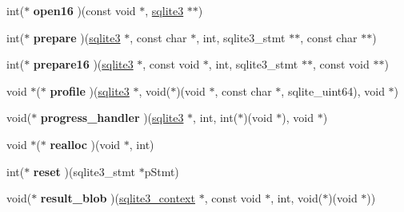 \begin{DoxyCompactItemize}
\item 
int($\ast$ {\bfseries open16} )(const void $\ast$, \hyperlink{structsqlite3}{sqlite3} $\ast$$\ast$)\hypertarget{structsqlite3__api__routines_a8394f1e962c0c3172ef7a0b6243303ca}{}\label{structsqlite3__api__routines_a8394f1e962c0c3172ef7a0b6243303ca}

\item 
int($\ast$ {\bfseries prepare} )(\hyperlink{structsqlite3}{sqlite3} $\ast$, const char $\ast$, int, sqlite3\+\_\+stmt $\ast$$\ast$, const char $\ast$$\ast$)\hypertarget{structsqlite3__api__routines_a6d5170ffef9564b7f9b157a14df4fd4d}{}\label{structsqlite3__api__routines_a6d5170ffef9564b7f9b157a14df4fd4d}

\item 
int($\ast$ {\bfseries prepare16} )(\hyperlink{structsqlite3}{sqlite3} $\ast$, const void $\ast$, int, sqlite3\+\_\+stmt $\ast$$\ast$, const void $\ast$$\ast$)\hypertarget{structsqlite3__api__routines_a3877cfcfebeb05e357317ab50a47e52e}{}\label{structsqlite3__api__routines_a3877cfcfebeb05e357317ab50a47e52e}

\item 
void $\ast$($\ast$ {\bfseries profile} )(\hyperlink{structsqlite3}{sqlite3} $\ast$, void($\ast$)(void $\ast$, const char $\ast$, sqlite\+\_\+uint64), void $\ast$)\hypertarget{structsqlite3__api__routines_a2f4fef66c120fa8480e60e60099052e3}{}\label{structsqlite3__api__routines_a2f4fef66c120fa8480e60e60099052e3}

\item 
void($\ast$ {\bfseries progress\+\_\+handler} )(\hyperlink{structsqlite3}{sqlite3} $\ast$, int, int($\ast$)(void $\ast$), void $\ast$)\hypertarget{structsqlite3__api__routines_a2888055619addf1d754e25d159d85718}{}\label{structsqlite3__api__routines_a2888055619addf1d754e25d159d85718}

\item 
void $\ast$($\ast$ {\bfseries realloc} )(void $\ast$, int)\hypertarget{structsqlite3__api__routines_afd935ceb7b7519dfc04ad9e05254a2c9}{}\label{structsqlite3__api__routines_afd935ceb7b7519dfc04ad9e05254a2c9}

\item 
int($\ast$ {\bfseries reset} )(sqlite3\+\_\+stmt $\ast$p\+Stmt)\hypertarget{structsqlite3__api__routines_a0ac99b0282f1843dbd0170c22be99957}{}\label{structsqlite3__api__routines_a0ac99b0282f1843dbd0170c22be99957}

\item 
void($\ast$ {\bfseries result\+\_\+blob} )(\hyperlink{structsqlite3__context}{sqlite3\+\_\+context} $\ast$, const void $\ast$, int, void($\ast$)(void $\ast$))\hypertarget{structsqlite3__api__routines_aab44964ab19917a95c1513890c5cdca2}{}\label{structsqlite3__api__routines_aab44964ab19917a95c1513890c5cdca2}


\end{DoxyCompactItemize}
